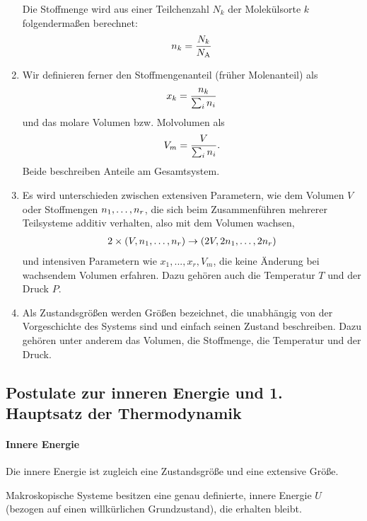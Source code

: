\begin{enumerate}
          Die Stoffmenge wird aus einer Teilchenzahl $N_k$ der Molekülsorte $k$ folgendermaßen berechnet:
          \begin{align*}
              n_k = \frac{N_k}{N_\mathrm{A}}
          \end{align*}
    \item Wir definieren ferner den Stoffmengenanteil (früher Molenanteil) als
          \begin{align*}
              x_k  = \frac{n_k}{\sum_i n_i}
          \end{align*}
          und das molare Volumen bzw. Molvolumen als
          \begin{align*}
              V_m = \frac{V}{\sum_i n_i}.
          \end{align*}
          Beide beschreiben Anteile am Gesamtsystem.
    \item Es wird unterschieden zwischen extensiven Parametern, wie dem Volumen $V$ oder Stoffmengen $n_1,\ldots,n_r$, die sich beim Zusammenführen mehrerer Teilsysteme additiv verhalten, also mit dem Volumen wachsen,
          \begin{align*}
              2\times(V,n_1,\ldots,n_r) \rightarrow (2V,2n_1,\ldots,2n_r)
          \end{align*}
          und intensiven Parametern wie $x_1,...,x_r,V_m$, die keine Änderung bei wachsendem Volumen erfahren. Dazu gehören auch die Temperatur $T$ und der Druck $P$.
    \item Als Zustandsgrößen werden Größen bezeichnet, die unabhängig von der Vorgeschichte des Systems sind und einfach seinen Zustand beschreiben. Dazu gehören unter anderem das Volumen, die Stoffmenge, die Temperatur und der Druck.
\end{enumerate}




\subsection{Postulate zur inneren Energie und 1. Hauptsatz der Thermodynamik}


\paragraph*{Innere Energie}

Die innere Energie ist zugleich eine Zustandsgröße und eine extensive Größe.
\begin{formal}
    Makroskopische Systeme besitzen eine genau definierte, innere Energie $U$ (bezogen auf einen willkürlichen Grundzustand), die erhalten bleibt.
\end{formal}

